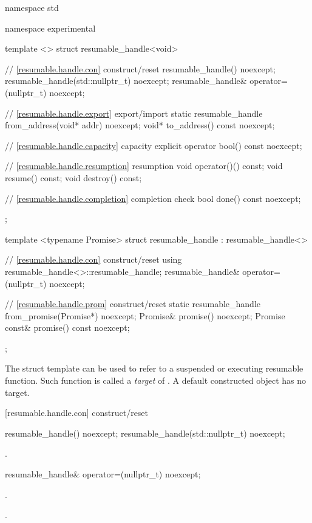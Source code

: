 %
\begin{codeblock}
namespace std {
  namespace experimental {
    template <>
    struct resumable_handle<void>
    {
      // \ref{resumable.handle.con} construct/reset
      resumable_handle() noexcept;		
      resumable_handle(std::nullptr_t) noexcept;
      resumable_handle& operator=(nullptr_t) noexcept;
      
      // \ref{resumable.handle.export} export/import
      static resumable_handle from_address(void* addr) noexcept;		
      void* to_address() const noexcept;
      
      // \ref{resumable.handle.capacity} capacity
      explicit operator bool() const noexcept;
      
      // \ref{resumable.handle.resumption} resumption
      void operator()() const;
      void resume() const;	
      void destroy() const;
      
      // \ref{resumable.handle.completion} completion check
      bool done() const noexcept; 
    };
    
    template <typename Promise>
    struct resumable_handle : resumable_handle<>
    {
      // \ref{resumable.handle.con} construct/reset
      using resumable_handle<>::resumable_handle;
      resumable_handle& operator=(nullptr_t) noexcept;
      
      // \ref{resumable.handle.prom} construct/reset
      static resumable_handle from_promise(Promise*) noexcept;		
      Promise& promise() noexcept;		
      Promise const& promise() const noexcept;
    };
  }
}
\end{codeblock}

\pnum
The struct template 
can be used to refer to a suspended or executing resumable function.
Such function is called a \textit{target} of .
A default constructed  object has no target.


[resumable.handle.con]{ construct/reset}
\begin{itemdecl}
  resumable_handle() noexcept;		
  resumable_handle(std::nullptr_t) noexcept;
\end{itemdecl}
\begin{itemdescr}
  \pnum\postconditions {}.
\end{itemdescr}

\begin{itemdecl}
  resumable_handle& operator=(nullptr_t) noexcept;
\end{itemdecl}
\begin{itemdescr}
	\pnum\postconditions {}.
  
  \pnum\returns {}.
\end{itemdescr}

